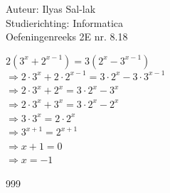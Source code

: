 \documentclass[a4paper]{article}
\begin{document}
\noindent \large Auteur: Ilyas Sal-lak \\
\noindent \large Studierichting: Informatica\\
\noindent \large Oefeningenreeks 2E nr. 8.18\\

\medskip

\normalsize

$2\left(3^x + 2^{x-1}\right) = 3\left(2^x - 3^{x-1}\right)$ \\

$\Rightarrow 2 \cdot 3^x + 2 \cdot 2^{x-1} = 3 \cdot 2^x - 3 \cdot 3^{x-1}$ \\

$\Rightarrow 2 \cdot 3^x + 2^x = 3 \cdot 2^x - 3^x$ \\

$\Rightarrow 2 \cdot 3^x + 3^x = 3 \cdot 2^x - 2^x$ \\

$\Rightarrow 3 \cdot 3^x = 2 \cdot 2^x$ \\

$\Rightarrow 3^{x+1} = 2^{x+1}$ \\

$\Rightarrow x + 1 = 0$ \\

$\Rightarrow x = -1$

\begin{thebibliography}{999}
\end{thebibliography}
\end{document}
